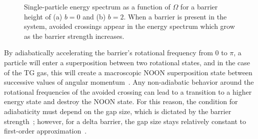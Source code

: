 \begin{figure}

 \centering

\caption{Single-particle energy spectrum as a function of $\Omega$ for a barrier height of (a) $b = 0$ and (b) $b=2$.
When a barrier is present in the system, avoided crossings appear in the energy spectrum which grow as the barrier strength increases.}
\label{fig:avoid}
\end{figure}

By adiabatically accelerating the barrier's rotational frequency from 0 to $\pi$, a particle will enter a superposition between two rotational states, and in the case of the TG gas, this will create a macroscopic NOON superposition state between successive values of angular momentum~\cite{hallwood2010}.
Any non-adiabatic behavior around the rotational frequencies of the avoided crossing can lead to a transition to a higher energy state and destroy the NOON state.
For this reason, the condition for adiabaticity must depend on the gap size, which is dictated by the barrier strength~\cite{nunnenkamp2008}; however, for a delta barrier, the gap size stays relatively constant to first-order approximation~\cite{hallwood2007}.

